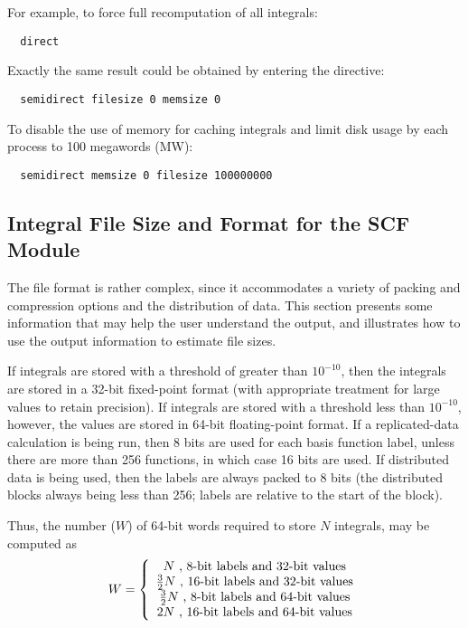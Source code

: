 For example, to force full recomputation of all integrals:
\begin{verbatim}
  direct
\end{verbatim}

Exactly the same result could be obtained by entering the directive:
\begin{verbatim}
  semidirect filesize 0 memsize 0
\end{verbatim}

To disable the use of memory for caching integrals and limit disk
usage by each process to 100 megawords (MW):
\begin{verbatim}
  semidirect memsize 0 filesize 100000000
\end{verbatim}


\subsection{Integral File Size and Format for the SCF Module}

The file format is rather complex, since it accommodates a variety of
packing and compression options and the distribution of data.  This
section presents some information that may help the user understand
the output, and illustrates how to use the output information to
estimate file sizes.

If integrals are stored with a threshold of greater than $10^{-10}$,
then the integrals are stored in a 32-bit fixed-point format (with
appropriate treatment for large values to retain precision).  If
integrals are stored with a threshold less than $10^{-10}$, however,
the values are stored in 64-bit floating-point format.  If a
replicated-data calculation is being run, then 8 bits are used for
each basis function label, unless there are more than 256 functions,
in which case 16 bits are used.  If distributed data is being used,
then the labels are always packed to 8 bits (the distributed blocks
always being less than 256; labels are relative to the start of the
block).

Thus, the number ($W$) of 64-bit words required to store $N$
integrals, may be computed as
\begin{displaymath}
  W = \left\{ \\
      \begin{array}{c}
        N \mbox{ , 8-bit labels and 32-bit values} \\
        \frac{3}{2}N \mbox{ , 16-bit labels and 32-bit values} \\
        \frac{3}{2}N \mbox{ , 8-bit labels and 64-bit values} \\
        2N \mbox{ , 16-bit labels and 64-bit values} 
      \end{array}
      \right.
\end{displaymath}

